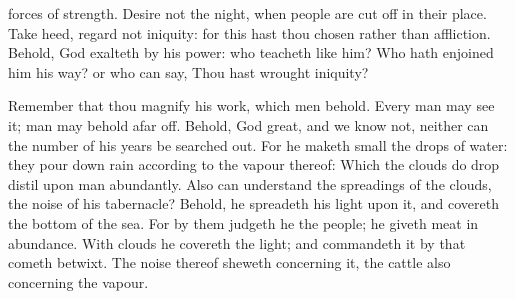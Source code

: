 {forces of
strength.
Desire not the
night, when
people are cut
off in their place.
Take
heed,
regard not
iniquity: for this hast thou
chosen rather than
affliction.
Behold,
God
exalteth by his
power: who
teacheth like him?
Who hath
enjoined him his
way? or who can
say, Thou hast
wrought
iniquity?
\par }{\PP {}Remember that thou
magnify his
work, which
men
behold.
Every
man may
see it;
man may
behold
{} afar
off.
Behold,
God
{}
great, and we
know
{} not, neither can the
number of his
years be searched
out.
For he maketh
small the
drops of
water: they pour
down
rain according to the
vapour thereof:
Which the
clouds do
drop
{}
distil upon
man
abundantly.
Also can
{}
understand the
spreadings of the
clouds,
{} the
noise of his
tabernacle?
Behold, he
spreadeth his
light upon it, and
covereth the
bottom of the
sea.
For by them
judgeth he the
people; he
giveth
meat in
abundance.
With
clouds he
covereth the
light; and
commandeth it
{} by
{} that cometh
betwixt.
The
noise thereof
sheweth concerning it, the
cattle also concerning the
vapour.

}
